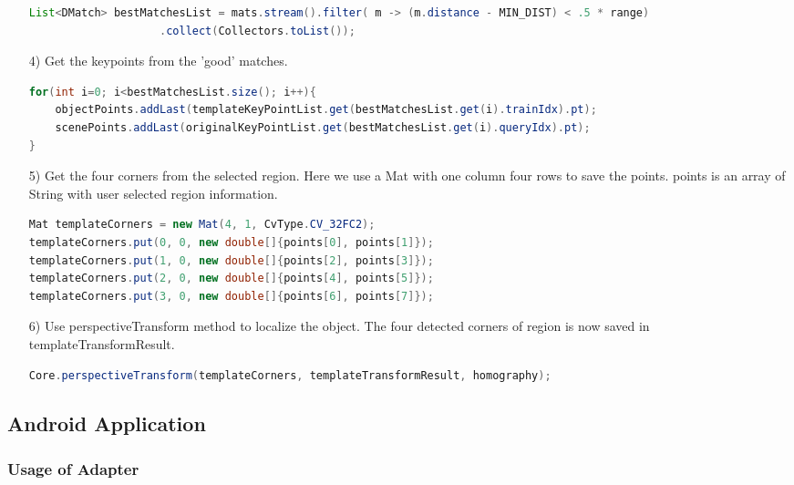 \begin{enumerate}
\begin{lstlisting}[language=JAVA]
List<DMatch> bestMatchesList = mats.stream().filter( m -> (m.distance - MIN_DIST) < .5 * range)
                    .collect(Collectors.toList());
\end{lstlisting} 
\item[4)] Get the keypoints from the 'good' matches.
\begin{lstlisting}[language=JAVA] 
 for(int i=0; i<bestMatchesList.size(); i++){
    objectPoints.addLast(templateKeyPointList.get(bestMatchesList.get(i).trainIdx).pt);
    scenePoints.addLast(originalKeyPointList.get(bestMatchesList.get(i).queryIdx).pt);
}
\end{lstlisting} 
\item[5)] Get the four corners from the selected region. Here we use a Mat with one column four rows to save the points. points is an array of String with user selected region information.
\begin{lstlisting}[language=JAVA] 
Mat templateCorners = new Mat(4, 1, CvType.CV_32FC2);
templateCorners.put(0, 0, new double[]{points[0], points[1]});
templateCorners.put(1, 0, new double[]{points[2], points[3]});
templateCorners.put(2, 0, new double[]{points[4], points[5]});
templateCorners.put(3, 0, new double[]{points[6], points[7]});
\end{lstlisting} 
\item[6)] Use perspectiveTransform method to localize the object. The four detected corners of region is now saved in templateTransformResult.
\begin{lstlisting}[language=JAVA] 
Core.perspectiveTransform(templateCorners, templateTransformResult, homography);
\end{lstlisting} 
\end{enumerate}

\subsection{Android Application}
\subsubsection{Usage of Adapter}
